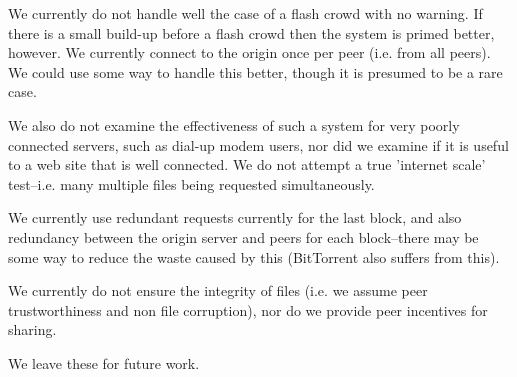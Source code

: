 We currently do not handle well the case of a flash crowd with no warning.  If there is a small build-up before a flash crowd then the system is primed better, however.  We currently connect to the origin once per peer (i.e. from all peers).  We could use some way to handle this better, though it is presumed to be a rare case.

We also do not examine the effectiveness of such a system for very poorly connected servers, such as dial-up modem users, nor did we examine if it is useful to a web site that is well connected.  We do not attempt a true 'internet scale' test--i.e. many multiple files being requested simultaneously.

We currently use redundant requests currently for the last block, and also redundancy between the origin server and peers for each block--there may be some way to reduce the waste caused by this (BitTorrent also suffers from this).

We currently do not ensure the integrity of files (i.e. we assume peer trustworthiness and non file corruption), nor do we provide peer incentives for sharing.

We leave these for future work.
